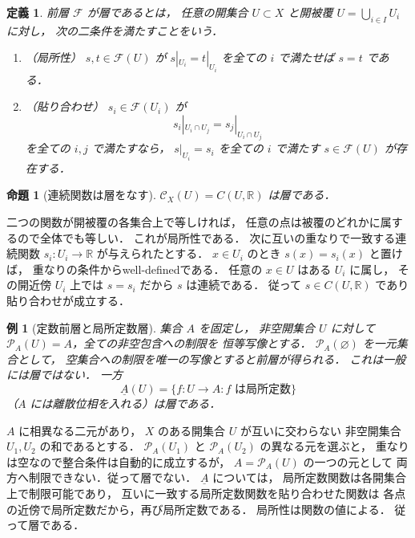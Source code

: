 \documentclass[a5paper,10pt,onecolumn]{jsarticle}
\makeatletter
\theoremstyle{mathnotetheorem}
\newtheorem{definition}[theorem]{定義}
\newtheorem{proposition}[theorem]{命題}
\newtheorem{example}[theorem]{例}
\renewcommand{\proofname}{証明}
\renewenvironment{proof}[1][\proofname]{%
  \par\pushQED{\qed}\normalfont\topsep4\p@\@plus2\p@\relax
  \trivlist\item[\hskip\labelsep\bfseries #1]\ignorespaces
}{\popQED\endtrivlist\@endpefalse}
\makeatother
\begin{document}
\begin{definition}
前層 $\mathcal F$ が\emph{層}であるとは，
任意の開集合 $U\subset X$ と開被覆
$U=\bigcup_{i\in I}U_i$ に対し，
次の二条件を満たすことをいう．
\begin{enumerate}
\item （局所性）
$s,t\in\mathcal F(U)$ が
$s|_{U_i}=t|_{U_i}$ を全ての $i$ で満たせば $s=t$ である．
\item （貼り合わせ）
$s_i\in\mathcal F(U_i)$ が
\[
 s_i|_{U_i\cap U_j}=s_j|_{U_i\cap U_j}
\]
を全ての $i,j$ で満たすなら，
$s|_{U_i}=s_i$ を全ての $i$ で満たす
$s\in\mathcal F(U)$ が存在する．
\end{enumerate}
\end{definition}

\begin{proposition}[連続関数は層をなす]\label{prop:continuous-sheaf}
$\mathcal C_X(U)=C(U,\mathbb R)$ は層である．
\end{proposition}
\begin{proof}
二つの関数が開被覆の各集合上で等しければ，
任意の点は被覆のどれかに属するので全体でも等しい．
これが局所性である．
次に互いの重なりで一致する連続関数
$s_i:U_i\to\mathbb R$ が与えられたとする．
$x\in U_i$ のとき $s(x)=s_i(x)$ と置けば，
重なりの条件からwell-definedである．
任意の $x\in U$ はある $U_i$ に属し，
その開近傍 $U_i$ 上では $s=s_i$ だから $s$ は連続である．
従って $s\in C(U,\mathbb R)$ であり貼り合わせが成立する．
\end{proof}

\begin{example}[定数前層と局所定数層]
集合 $A$ を固定し，
非空開集合 $U$ に対して
$\mathcal P_A(U)=A$，全ての非空包含への制限を
恒等写像とする．
$\mathcal P_A(\varnothing)$ を一元集合として，
空集合への制限を唯一の写像とすると前層が得られる．
これは一般には層ではない．
一方
\[
 \underline A(U)=\{f:U\to A:
 f\text{ は局所定数}\}
\]
（$A$ には離散位相を入れる）は層である．
\end{example}
\begin{proof}
$A$ に相異なる二元があり，
$X$ のある開集合 $U$ が互いに交わらない
非空開集合 $U_1,U_2$ の和であるとする．
$\mathcal P_A(U_1)$ と $\mathcal P_A(U_2)$ の異なる元を選ぶと，
重なりは空なので整合条件は自動的に成立するが，
$A=\mathcal P_A(U)$ の一つの元として
両方へ制限できない．従って層でない．
$\underline A$ については，
局所定数関数は各開集合上で制限可能であり，
互いに一致する局所定数関数を貼り合わせた関数は
各点の近傍で局所定数だから，再び局所定数である．
局所性は関数の値による．
従って層である．
\end{proof}
\end{document}
